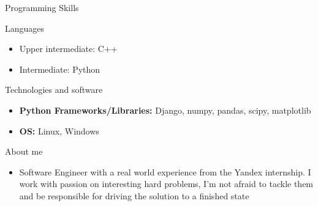 \documentclass[]{mcdowellcv}
\begin{document}
	\begin{cvsection}{Programming Skills}
            \vskip 0.1cm
		\begin{cvsubsection}{Languages}{}{}
			\begin{itemize}
                            \item Upper intermediate: C++
                            \item Intermediate: Python
			\end{itemize}
		\end{cvsubsection}
                \begin{cvsubsection}{Technologies and software}{}{}
                    \begin{itemize}
                        \item \textbf{Python Frameworks/Libraries:} Django, numpy, pandas, scipy, matplotlib
                        \item \textbf{OS:} Linux, Windows
                    \end{itemize}
                \end{cvsubsection}
	\end{cvsection}

        \begin{cvsection}{About me}
            \vskip 0.1cm
            \begin{cvsubsection}{}{}{}
                \begin{itemize}
                    \item
                        Software Engineer with a real world experience from the Yandex
                        internship. I work with passion on interesting hard problems, I'm not
                        afraid to tackle them and be responsible for driving the solution to a
                        finished state
                \end{itemize}
            \end{cvsubsection}
        \end{cvsection}
\end{document}
